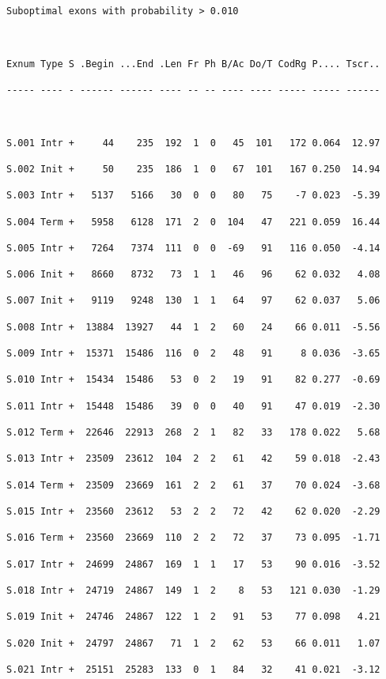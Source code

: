 \documentclass[en,black,10pt,normal]{elegantnote}
\begin{document}
\begin{lstlisting}[frame=single]
Suboptimal exons with probability > 0.010



Exnum Type S .Begin ...End .Len Fr Ph B/Ac Do/T CodRg P.... Tscr..

----- ---- - ------ ------ ---- -- -- ---- ---- ----- ----- ------



S.001 Intr +     44    235  192  1  0   45  101   172 0.064  12.97

S.002 Init +     50    235  186  1  0   67  101   167 0.250  14.94

S.003 Intr +   5137   5166   30  0  0   80   75    -7 0.023  -5.39

S.004 Term +   5958   6128  171  2  0  104   47   221 0.059  16.44

S.005 Intr +   7264   7374  111  0  0  -69   91   116 0.050  -4.14

S.006 Init +   8660   8732   73  1  1   46   96    62 0.032   4.08

S.007 Init +   9119   9248  130  1  1   64   97    62 0.037   5.06

S.008 Intr +  13884  13927   44  1  2   60   24    66 0.011  -5.56

S.009 Intr +  15371  15486  116  0  2   48   91     8 0.036  -3.65

S.010 Intr +  15434  15486   53  0  2   19   91    82 0.277  -0.69

S.011 Intr +  15448  15486   39  0  0   40   91    47 0.019  -2.30

S.012 Term +  22646  22913  268  2  1   82   33   178 0.022   5.68

S.013 Intr +  23509  23612  104  2  2   61   42    59 0.018  -2.43

S.014 Term +  23509  23669  161  2  2   61   37    70 0.024  -3.68

S.015 Intr +  23560  23612   53  2  2   72   42    62 0.020  -2.29

S.016 Term +  23560  23669  110  2  2   72   37    73 0.095  -1.71

S.017 Intr +  24699  24867  169  1  1   17   53    90 0.016  -3.52

S.018 Intr +  24719  24867  149  1  2    8   53   121 0.030  -1.29

S.019 Init +  24746  24867  122  1  2   91   53    77 0.098   4.21

S.020 Init +  24797  24867   71  1  2   62   53    66 0.011   1.07

S.021 Intr +  25151  25283  133  0  1   84   32    41 0.021  -3.12


\end{lstlisting}
\end{document}
